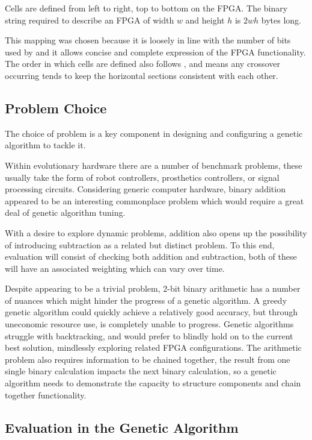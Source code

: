Cells are defined from left to right, top to bottom on the FPGA. The
binary string required to describe an FPGA of width $w$ and height $h$ is $2wh$
bytes long.

This mapping was chosen because it is loosely in line with the number of bits
used by \cite{10.1007/3-540-63173-9_61} and it allows concise and complete expression of
the FPGA functionality. The order in which cells are defined also follows
\cite{10.1007/3-540-63173-9_61}, and means any crossover occurring tends to keep
the horizontal sections consistent with each other.

\subsection{Problem Choice}

The choice of problem is a key component in designing and configuring a genetic
algorithm to tackle it.

Within evolutionary hardware there are a number of benchmark problems, these usually
take the form of robot controllers, prosthetics controllers, or signal processing
circuits. Considering generic computer hardware, binary addition appeared to be
an interesting commonplace problem which would require a great deal of genetic algorithm tuning.

With a desire to explore dynamic problems, addition also opens up the possibility of
introducing subtraction as a related but distinct problem. To this end, evaluation
will consist of checking both addition and subtraction, both of these will have an
associated weighting which can
vary over time.

Despite appearing to be a trivial problem, 2-bit binary arithmetic has a number of
nuances which might hinder the progress of a genetic algorithm. A greedy genetic
algorithm could quickly achieve a relatively good accuracy, but through uneconomic
resource use, is completely unable to progress. Genetic algorithms struggle with backtracking,
and would prefer to blindly hold on to the current best solution, mindlessly exploring
related FPGA configurations. The arithmetic problem also requires information to be
chained together, the result from one single binary calculation impacts the next binary
calculation, so a genetic algorithm needs to demonstrate the capacity to structure
components and chain together functionality.

\subsection{Evaluation in the Genetic Algorithm}

